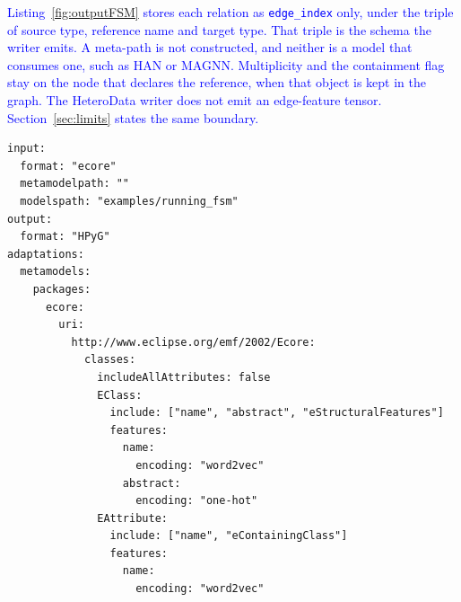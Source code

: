 \documentclass[journal,article,submit,moreauthors,technologies]{Definitions/mdpi}
\newcommand{\rev}[1]{\textcolor{blue}{#1}}
\begin{document}
\rev{Listing~\ref{fig:outputFSM} stores each relation as \texttt{edge\_index} only, under the triple of source type, reference name and target type. That triple is the schema the writer emits. A meta-path is not constructed, and neither is a model that consumes one, such as HAN or MAGNN. Multiplicity and the containment flag stay on the node that declares the reference, when that object is kept in the graph. The HeteroData writer does not emit an edge-feature tensor. Section~\ref{sec:limits} states the same boundary.}



\begin{program_}[H]
\footnotesize
\begin{verbatim}
input:
  format: "ecore"
  metamodelpath: ""
  modelspath: "examples/running_fsm"
output:
  format: "HPyG"
adaptations:
  metamodels:
    packages:
      ecore:
        uri:
          http://www.eclipse.org/emf/2002/Ecore:
            classes:
              includeAllAttributes: false
              EClass:
                include: ["name", "abstract", "eStructuralFeatures"]
                features:
                  name:
                    encoding: "word2vec"
                  abstract:
                    encoding: "one-hot"
              EAttribute:
                include: ["name", "eContainingClass"]
                features:
                  name:
                    encoding: "word2vec"
\end{verbatim}
\caption{\rev{A configuration that encodes the running-example metamodel. \texttt{eType} is a reference, so it stays an edge; the encoding keys apply to the attributes \texttt{name} and \texttt{abstract}.}}
\label{code:yamlecoreAttribute}
\end{program_}
\end{document}
